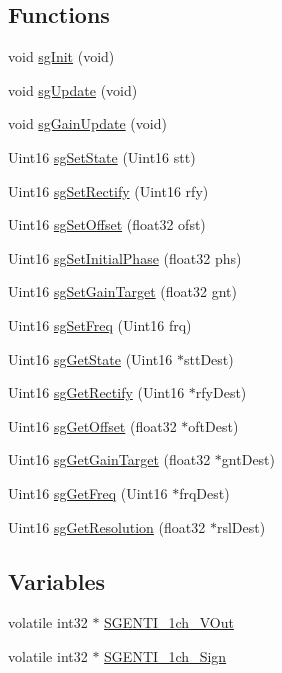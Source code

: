 \subsection*{Functions}
\begin{DoxyCompactItemize}
\item 
void \hyperlink{a00033_a41e810f7181a4ecaa5bc5f0713c6db89}{sg\-Init} (void)
\item 
void \hyperlink{a00033_a4ad7c6eca0c2bcdadaa81dd3fbb9df4b}{sg\-Update} (void)
\item 
void \hyperlink{a00033_a9d1f773315008eac3fc68486f3c9b02a}{sg\-Gain\-Update} (void)
\item 
Uint16 \hyperlink{a00033_a4da3578fed6e04e782a037a270ebde65}{sg\-Set\-State} (Uint16 stt)
\item 
Uint16 \hyperlink{a00033_a663b333309e306b76cc538d8b057ca7d}{sg\-Set\-Rectify} (Uint16 rfy)
\item 
Uint16 \hyperlink{a00033_ac4fa27b2a1e42815c53a9c41aea39dae}{sg\-Set\-Offset} (float32 ofst)
\item 
Uint16 \hyperlink{a00033_ac0b4e573457d4a6e3102c17ec9c3281a}{sg\-Set\-Initial\-Phase} (float32 phs)
\item 
Uint16 \hyperlink{a00033_a1352efb3adb6289a295afa3961d4a352}{sg\-Set\-Gain\-Target} (float32 gnt)
\item 
Uint16 \hyperlink{a00033_a3be6fb433900f4d91074b337ea3dba58}{sg\-Set\-Freq} (Uint16 frq)
\item 
Uint16 \hyperlink{a00033_ab720e3168a284abe388edf230705e4b4}{sg\-Get\-State} (Uint16 $\ast$stt\-Dest)
\item 
Uint16 \hyperlink{a00033_a2257f55d8be03a940f80091c77b70b59}{sg\-Get\-Rectify} (Uint16 $\ast$rfy\-Dest)
\item 
Uint16 \hyperlink{a00033_a56832d4be61bfbb6263eef6100515365}{sg\-Get\-Offset} (float32 $\ast$oft\-Dest)
\item 
Uint16 \hyperlink{a00033_aaf39e7e31c43b94af71863a1ca3c5704}{sg\-Get\-Gain\-Target} (float32 $\ast$gnt\-Dest)
\item 
Uint16 \hyperlink{a00033_a927bad9dd75bf9372d0becfe714a66c7}{sg\-Get\-Freq} (Uint16 $\ast$frq\-Dest)
\item 
Uint16 \hyperlink{a00033_ad625f20b4e4f394215e615071b9217b0}{sg\-Get\-Resolution} (float32 $\ast$rsl\-Dest)
\end{DoxyCompactItemize}
\subsection*{Variables}
\begin{DoxyCompactItemize}
\item 
volatile int32 $\ast$ \hyperlink{a00033_a5dba1fe543c9e62ef6cc8cf4179de951}{S\-G\-E\-N\-T\-I\-\_\-1ch\-\_\-\-V\-Out}
\item 
volatile int32 $\ast$ \hyperlink{a00033_a5369a96cf47ea2fbd84a92ed4091b48b}{S\-G\-E\-N\-T\-I\-\_\-1ch\-\_\-\-Sign}
\end{DoxyCompactItemize}


